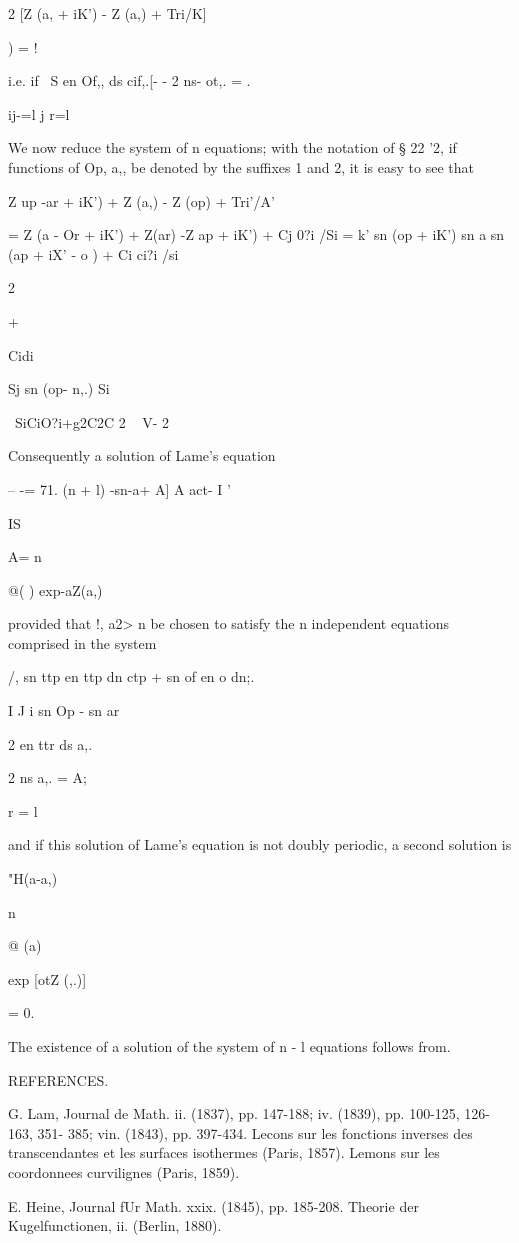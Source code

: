 {{{{{{{{2 [Z (a, + iK') - Z (a,) + Tri/K]

) = !

i.e. if \ S en Of,, ds cif,.[- - 2 ns- ot,. = .

ij-=l j r=l

We now reduce the system of n equations; with the notation of § 22
'2, if functions of Op, a,, be denoted by the suffixes 1 and 2, it is
easy to see that

Z up -ar + iK') + Z (a,) - Z (op) + Tri'/A'

= Z (a - Or + iK') + Z(ar) -Z ap + iK') + Cj 0?i /Si = k' sn (op +
iK') sn a sn (ap + iX' - o ) + Ci ci?i /si

 2

+

Cidi

Sj sn (op- n,.) Si

\ SiCiO?i+g2C2C 2 ~ V- 2

Consequently a solution of Lame's equation

-- -= 71. (n + l) -sn-a+ A] A act- I '

IS

A= n

@( ) exp-aZ(a,)

provided that !, a2>  n be chosen to satisfy the n independent
equations comprised in the system

/, sn ttp en ttp dn ctp + sn of en o dn;. \

I J i sn Op - sn ar

2 en ttr ds a,.

2 ns a,. = A;

r = l

and if this solution of Lame's equation is not doubly periodic, a
second solution is

"H(a-a,)

n

@ (a)

exp [otZ (,.)]

= 0.

The existence of a solution of the system of n - l equations follows
from.

REFERENCES.

G. Lam, Journal de Math. ii. (1837), pp. 147-188; iv. (1839), pp.
100-125, 126-163, 351- 385; vin. (1843), pp. 397-434. Lecons sur les
fonctions inverses des transcendantes et les surfaces isothermes
(Paris, 1857). Lemons sur les coordonnees curvilignes (Paris, 1859).

E. Heine, Journal fUr Math. xxix. (1845), pp. 185-208. Theorie der
Kugelfunctionen, ii. (Berlin, 1880).

}}}}}}}}
